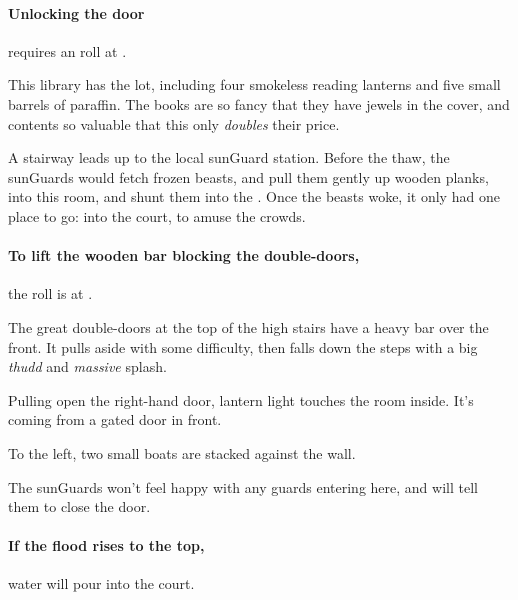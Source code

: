 \begin{multicols}{2}
\paragraph{Unlocking the door}
requires an  roll at \tn[13].


This library has the lot, including four smokeless reading lanterns and five small barrels of paraffin.
The books are so fancy that they have jewels in the cover, and contents so valuable that this only \emph{doubles} their price.




\begin{exampletext}
  A stairway leads up to the local \gls{sunGuard} station.
  Before the thaw, the \glspl{sunGuard} would fetch frozen beasts, and pull them gently up wooden planks, into this room, and shunt them into the .
  Once the beasts woke, it only had one place to go: into the \gls{court}, to amuse the crowds.
\end{exampletext}

\paragraph{To lift the wooden bar blocking the double-doors,}
the roll is  at \tn[7].

\begin{boxtext}
  The great double-doors at the top of the high stairs have a heavy bar over the front.
  It pulls aside with some difficulty, then falls down the steps with a big \emph{thudd} and \emph{massive} splash.

  Pulling open the right-hand door, lantern light touches the room inside.
  It's coming from a gated door in front.

  To the left, two small boats are stacked against the wall.
\end{boxtext}

The \glspl{sunGuard} won't feel happy with any \glspl{guard} entering here, and will tell them to close the door.

\paragraph{If the flood rises to the top,}
water will pour into the \gls{court}.


\end{multicols}
